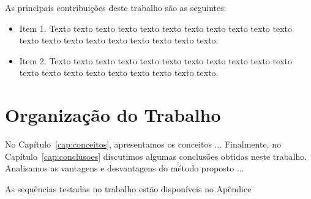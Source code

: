 As principais contribuições deste trabalho são as seguintes:

\begin{itemize}
  \item Item 1. Texto texto texto texto texto texto texto texto texto texto
  texto texto texto texto texto texto texto texto texto texto.

  \item Item 2. Texto texto texto texto texto texto texto texto texto texto
  texto texto texto texto texto texto texto texto texto texto.

\end{itemize}

\section{Organização do Trabalho}
\label{sec:organizacao_trabalho}

No Capítulo~\ref{cap:conceitos}, apresentamos os conceitos ... Finalmente, no
Capítulo~\ref{cap:conclusoes} discutimos algumas conclusões obtidas neste
trabalho. Analisamos as vantagens e desvantagens do método proposto ...

As sequências testadas no trabalho estão disponíveis no Apêndice
